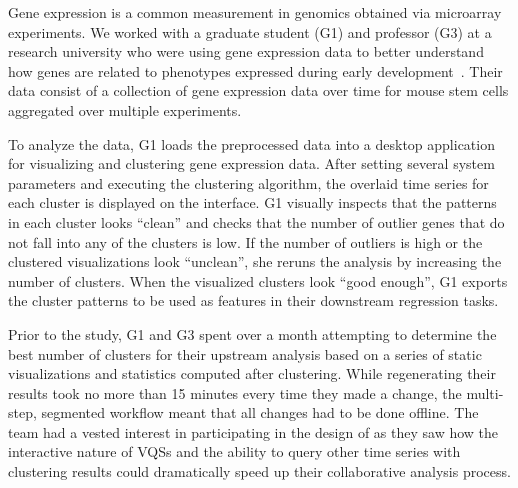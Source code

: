 \par\noindent{} Gene expression is a common measurement in genomics obtained via microarray experiments.  We worked with a graduate student (G1) and professor (G3) at a research university who were using gene expression data to better understand how genes are related to phenotypes expressed during early development~\cite{Peng2016,Gloss2017}. Their data consist of a collection of gene expression data over time for mouse stem cells aggregated over multiple experiments. %
\par To analyze the data, G1 loads the preprocessed data into a desktop application for visualizing and clustering gene expression data. After setting several system parameters and executing the clustering algorithm, the overlaid time series for each cluster is displayed on the interface. G1 visually inspects that the patterns in each cluster looks ``clean'' and checks that the number of outlier genes that do not fall into any of the clusters is low.  If the number of outliers is high or the clustered visualizations look ``unclean'', she reruns the analysis by increasing the number of clusters. When the visualized clusters look ``good enough'', G1 exports the cluster patterns to be used as features in their downstream regression tasks.
\par Prior to the study, G1 and G3 spent over a month attempting to determine the best number of clusters for their upstream analysis based on a series of static visualizations and statistics computed after clustering. While regenerating their results took no more than 15 minutes every time they made a change, the multi-step, segmented workflow meant that all changes had to be done offline. The team had a vested interest in participating in the design of \zv as they saw how the interactive nature of VQSs and the ability to query other time series with clustering results could dramatically speed up their collaborative analysis process.
